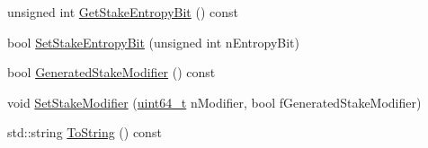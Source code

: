 \begin{DoxyCompactItemize}
unsigned int \hyperlink{class_c_block_index_a54bbd7ae647d4097ac7915f1cefed2c7}{Get\+Stake\+Entropy\+Bit} () const 
\item 
bool \hyperlink{class_c_block_index_a7a161878ce10e36cf7c12004f31357cf}{Set\+Stake\+Entropy\+Bit} (unsigned int n\+Entropy\+Bit)
\item 
bool \hyperlink{class_c_block_index_a9133ab4850ecece72a92b7203ead5954}{Generated\+Stake\+Modifier} () const 
\item 
void \hyperlink{class_c_block_index_acc51fc41aa2b57c4f700aa09cdde92f8}{Set\+Stake\+Modifier} (\hyperlink{stdint_8h_aaa5d1cd013383c889537491c3cfd9aad}{uint64\+\_\+t} n\+Modifier, bool f\+Generated\+Stake\+Modifier)
\item 
std\+::string \hyperlink{class_c_block_index_abed1fcbcd372db6b9efa6bb9da317469}{To\+String} () const 
\end{DoxyCompactItemize}
